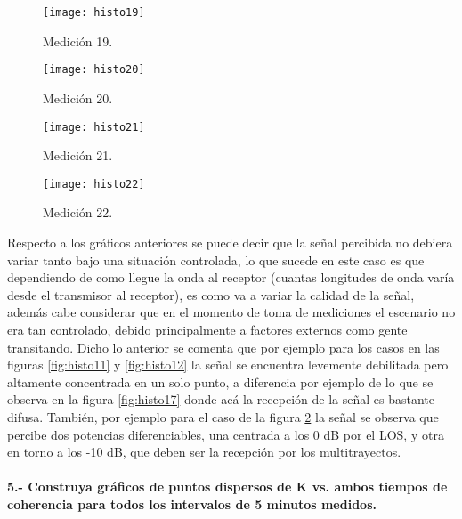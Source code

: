 \documentclass[12pt]{article}
\begin{document}
\begin{figure}[H]
\hfill
\begin{minipage}[t]{.45\textwidth}
  \centering
        \texttt{[image: histo19]}
		\caption{\footnotesize Medición 19.}
\label{fig:histo19}
\end{minipage}
\hfill
\begin{minipage}[t]{.45\textwidth}
  \centering
        \texttt{[image: histo20]}
		\caption{\footnotesize Medición 20.}
\label{fig:histo20}
\end{minipage}
\end{figure}

\begin{figure}[H]
\hfill
\begin{minipage}[t]{.45\textwidth}
  \centering
        \texttt{[image: histo21]}
		\caption{\footnotesize Medición 21.}
\label{fig:histo21}
\end{minipage}
\hfill
\begin{minipage}[t]{.45\textwidth}
  \centering
        \texttt{[image: histo22]}
		\caption{\footnotesize Medición 22.}
\label{fig:histo22}
\end{minipage}
\end{figure}

Respecto a los gráficos anteriores se puede decir que la señal percibida no debiera variar tanto
bajo una situación controlada, lo que sucede en este caso es que dependiendo de como llegue la 
onda al receptor (cuantas longitudes de onda varía desde el transmisor al receptor), es como va 
a variar la calidad de la señal, además cabe considerar que en el momento de toma de mediciones 
el escenario no era tan controlado, debido principalmente a factores externos como gente transitando.
Dicho lo anterior se comenta que por ejemplo para los casos en las figuras \ref{fig:histo11} 
y \ref{fig:histo12} la señal se encuentra levemente debilitada pero altamente concentrada en un 
solo punto, a diferencia por ejemplo de lo que se observa en la figura \ref{fig:histo17} donde acá 
la recepción de la señal es bastante difusa. También, por ejemplo para el caso de la figura 
\ref{fig:histo22} la señal se observa que percibe dos potencias diferenciables, una centrada a los 0
dB por el LOS, y otra en torno a los -10 dB, que deben ser la recepción por los multitrayectos.


\paragraph{5.- Construya gráficos de puntos dispersos de K vs. ambos tiempos de coherencia para
todos los intervalos de 5 minutos medidos.\\}
\end{document}
